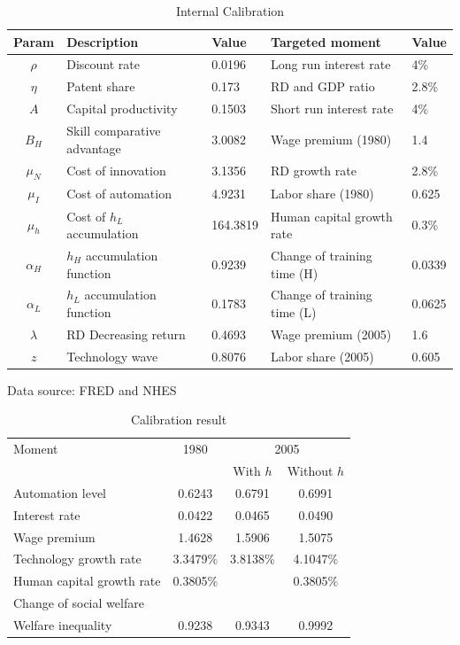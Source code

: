 \documentclass[12pt]{article}
\begin{document}
\begin{table}[h!]
\center
\caption{Internal Calibration}
\label{calibration2}
\begin{tabular}{cll|ll}
\hline \hline
Param & Description                      & Value & Targeted moment           & Value  \\ \hline
$\rho$    & Discount rate         &  0.0196    &  Long run interest rate & 4\%   \\
$\eta$    & Patent share                  &  0.173    & RD and GDP ratio & 2.8\% \\
$A$       & Capital productivity               &     0.1503   & Short run interest rate      & 4\%   \\
$B_H$     & Skill comparative advantage  &  3.0082     & Wage premium (1980)      & 1.4    \\
$\mu_N$ & Cost of innovation   &   3.1356     & RD growth rate  & 2.8\%   \\
$\mu_I$ & Cost of automation   &  4.9231     & Labor share (1980)         & 0.625   \\
$\mu_h$ & Cost of $h_L$ accumulation   &   164.3819     & Human capital growth rate & 0.3\% \\
$\alpha_H$     & $h_H$ accumulation function   &   0.9239     & Change of training time  (H)  & 0.0339 \\
$\alpha_L$     &  $h_L$ accumulation function   &   0.1783  & Change of training time  (L) & 0.0625 \\
$\lambda$ & RD Decreasing return  &   	0.4693   & Wage premium (2005)   & 1.6 \\
$z$      & Technology wave       &    0.8076   &  Labor share (2005)        & 0.605    \\\hline
\end{tabular}
{\scriptsize Data source: FRED and NHES}
\end{table}

\begin{table}
\center
\caption{Calibration result}
\begin{tabular}{l|c|cc}
\hline \hline
Moment & 1980 &  \multicolumn{2}{c}{2005} \\ 
&  & With $h$ &  Without $h$ \\ \hline
Automation level & 0.6243 & 0.6791 & 0.6991 \\
Interest rate & 0.0422 & 0.0465 & 0.0490\\
Wage premium   & 1.4628 &1.5906  &1.5075\\
Technology growth rate  &3.3479\% & 3.8138\% & 4.1047\%\\
Human capital growth rate  & 0.3805\% & & 0.3805\%\\
Change of social welfare  & & &\\
Welfare inequality  & 0.9238 & 0.9343 & 0.9992\\ \hline
\end{tabular}
\end{table}
\end{document}
